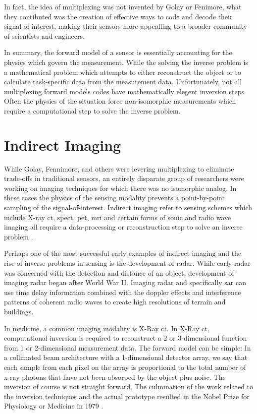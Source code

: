In fact, the idea of multiplexing was not invented by Golay or Fenimore, what they contibuted was the creation of effective ways to code and decode their signal-of-interest, making their sensors more appealling to a broader community of scientists and engineers.

In summary, the forward model of a sensor is essentially accounting for the physics which govern the measurement. While the solving the inverse problem is a mathematical problem which attempts to either reconstruct the object or to calculate task-specific data from the measurement data. Unfortunately, not all multiplexing forward models codes have mathematically elegent inversion steps. Often the physics of the situation force non-isomorphic measurements which require a computational step to solve the inverse problem. 

\section{Indirect Imaging}

While Golay, Fennimore, and others were levering multiplexing to eliminate trade-offs in traditional sensors, an entirely disparate group of researchers were working on imaging techniques for which there was no isomorphic analog. In these cases the physics of the sensing modality prevents a point-by-point sampling of the signal-of-interest. Indirect imaging refer to sensing schemes which include X-ray \gls{ct}, \gls{spect}, \gls{pet}, \gls{mri} and certain forms of sonic and radio wave imaging all require a data-processing or reconstruction step to solve an inverse problem \cite{barrett2013foundations}. 

Perhaps one of the most successful early examples of indirect imaging and the rise of inverse problems in sensing is the development of radar. While early radar was concerned with the detection and distance of an object, development of imaging radar began after World War II. Imaging radar and specifically \gls{sar} can use time delay information combined with the doppler effects and interference patterns of coherent radio waves to create high resolutions of terrain and buildings. 

In medicine, a common imaging modality is X-Ray \gls{ct}. In X-Ray \gls{ct}, computational inversion is required to reconstruct a 2 or 3-dimensional function from 1 or 2-dimensional measurement data. The forward model can be simple: In a collimated beam architecture with a 1-dimensional detector array, we say that each sample from each pixel on the array is proportional to the total number of x-ray photons that have not been absorped by the object \cite{radon20051} plus noise. The inversion of course is not straight forward. The culmination of the work related to the inversion techniques and the actual prototype resulted in the Nobel Prize for Physiology or Medicine in 1979 \cite{nobelprize1979medicine}. 

